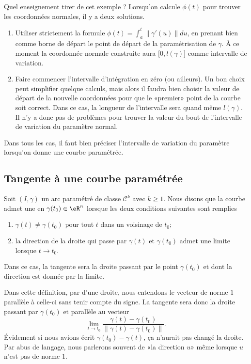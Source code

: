 Quel enseignement tirer de cet exemple ? Lorsqu'on calcule $\phi(t)$ pour trouver les coordonnées normales, il y a deux solutions.
\begin{enumerate}
    \item
        Utiliser strictement la formule $\phi(t)=\int_a^t\| \gamma'(u) \|du$, en prenant bien comme borne de départ le point de départ de la paramétrisation de $\gamma$. À ce moment la coordonnée normale construite aura $\mathopen[ 0 , l(\gamma) \mathclose]$ comme intervalle de variation.
    \item
        Faire commencer l'intervalle d'intégration en zéro (ou ailleurs). Un bon choix peut simplifier quelque calculs, mais alors il faudra bien choisir la valeur de départ de la nouvelle coordonnées pour que le «premier» point de la courbe soit correct. Dans ce cas, la longueur de l'intervalle sera quand même $l(\gamma)$. Il n'y a donc pas de problèmes pour trouver la valeur du bout de l'intervalle de variation du paramètre normal.
\end{enumerate}
Dans tous les cas, il faut bien préciser l'intervalle de variation du paramètre lorsqu'on donne une courbe paramétrée.

\subsection{Tangente à une courbe paramétrée}

\begin{definition}
    Soit $(I,\gamma)$ un arc paramétré de classe $\mathcal{C}^k$ avec $k\geq 1$. Nous disons que la courbe admet une  en $\gamma(t_0)\in\eR^n$ lorsque les deux conditions suivantes sont remplies
    \begin{enumerate}
        \item
            $\gamma(t)\neq \gamma(t_0)$ pour tout $t$ dans un voisinage de $t_0$;
        \item
            la direction de la droite qui passe par $\gamma(t)$ et $\gamma(t_0)$ admet une limite lorsque $t\to t_0$.
    \end{enumerate}
    Dans ce cas, la tangente sera la droite passant par le point $\gamma(t_0)$ et dont la direction est donnée par la limite.
\end{definition}
Dans cette définition, par  d'une droite, nous entendons le vecteur de norme $1$ parallèle à celle-ci sans tenir compte du signe. La tangente sera donc la droite passant par $\gamma(t_0)$ et parallèle au vecteur
\begin{equation}
    \lim_{t\to t_0}\frac{ \gamma(t)-\gamma(t_0) }{ \| \gamma(t)-\gamma(t_0) \| }. 
\end{equation}
Évidement si nous avions écrit $\gamma(t_0)-\gamma(t)$, ça n'aurait pas changé la droite. Par abus de langage, nous parlerons souvent de «la direction $u$» même lorsque $u$ n'est pas de norme $1$.

